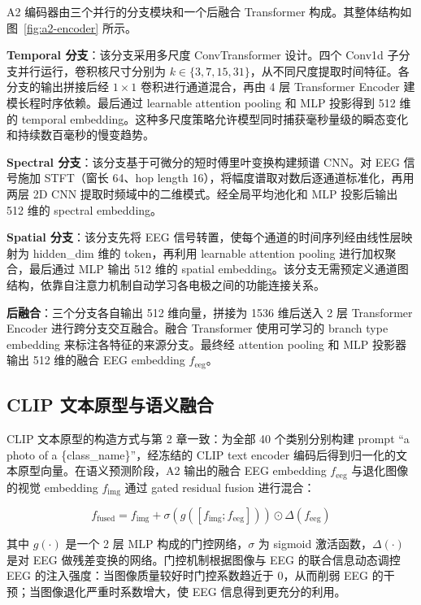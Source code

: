 A2 编码器由三个并行的分支模块和一个后融合 Transformer 构成。其整体结构如图~\ref{fig:a2-encoder} 所示。


\textbf{Temporal 分支}：该分支采用多尺度 ConvTransformer 设计。四个 Conv1d 子分支并行运行，卷积核尺寸分别为 $k \in \{3, 7, 15, 31\}$，从不同尺度提取时间特征。各分支的输出拼接后经 $1\times1$ 卷积进行通道混合，再由 4 层 Transformer Encoder 建模长程时序依赖。最后通过 learnable attention pooling 和 MLP 投影得到 512 维的 temporal embedding。这种多尺度策略允许模型同时捕获毫秒量级的瞬态变化和持续数百毫秒的慢变趋势。

\textbf{Spectral 分支}：该分支基于可微分的短时傅里叶变换构建频谱 CNN。对 EEG 信号施加 STFT（窗长 64、hop length 16），将幅度谱取对数后逐通道标准化，再用两层 2D CNN 提取时频域中的二维模式。经全局平均池化和 MLP 投影后输出 512 维的 spectral embedding。

\textbf{Spatial 分支}：该分支先将 EEG 信号转置，使每个通道的时间序列经由线性层映射为 hidden\_dim 维的 token，再利用 learnable attention pooling 进行加权聚合，最后通过 MLP 输出 512 维的 spatial embedding。该分支无需预定义通道图结构，依靠自注意力机制自动学习各电极之间的功能连接关系。

\textbf{后融合}：三个分支各自输出 512 维向量，拼接为 1536 维后送入 2 层 Transformer Encoder 进行跨分支交互融合。融合 Transformer 使用可学习的 branch type embedding 来标注各特征的来源分支。最终经 attention pooling 和 MLP 投影器输出 512 维的融合 EEG embedding $f_{\mathrm{eeg}}$。

\subsection{CLIP 文本原型与语义融合}

CLIP 文本原型的构造方式与第 2 章一致：为全部 40 个类别分别构建 prompt ``a photo of a \{class\_name\}''，经冻结的 CLIP text encoder 编码后得到归一化的文本原型向量。在语义预测阶段，A2 输出的融合 EEG embedding $f_{\mathrm{eeg}}$ 与退化图像的视觉 embedding $f_{\mathrm{img}}$ 通过 gated residual fusion 进行混合：

\begin{equation}
  f_{\mathrm{fused}} = f_{\mathrm{img}} + \sigma\left(g\left([f_{\mathrm{img}}; f_{\mathrm{eeg}}]\right)\right) \odot \Delta(f_{\mathrm{eeg}})
\end{equation}

其中 $g(\cdot)$ 是一个 2 层 MLP 构成的门控网络，$\sigma$ 为 sigmoid 激活函数，$\Delta(\cdot)$ 是对 EEG 做残差变换的网络。门控机制根据图像与 EEG 的联合信息动态调控 EEG 的注入强度：当图像质量较好时门控系数趋近于 0，从而削弱 EEG 的干预；当图像退化严重时系数增大，使 EEG 信息得到更充分的利用。

